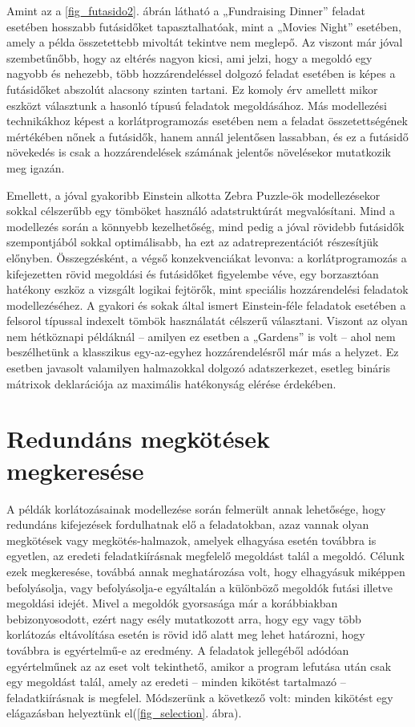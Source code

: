\documentclass[12pt,a4paper,twoside, openright]{report}
\begin{document}

    Amint az a \ref{fig_futasido2}. ábrán látható a „Fundraising Dinner” feladat esetében hosszabb futásidőket tapasztalhatóak, mint a „Movies Night” esetében, amely a példa összetettebb mivoltát tekintve nem meglepő.
    Az viszont már jóval szembetűnőbb, hogy az eltérés nagyon kicsi, ami jelzi, hogy a megoldó egy nagyobb és nehezebb, több hozzárendeléssel dolgozó feladat esetében is képes a futásidőket abszolút alacsony szinten tartani.
    Ez komoly érv amellett mikor eszközt választunk a hasonló típusú feladatok megoldásához.
    Más modellezési technikákhoz képest a korlátprogramozás esetében nem a feladat összetettségének mértékében nőnek a futásidők, hanem annál jelentősen lassabban, és ez a futásidő növekedés is csak a hozzárendelések számának jelentős növelésekor mutatkozik meg igazán.

    Emellett, a jóval gyakoribb Einstein alkotta Zebra Puzzle-ök modellezésekor sokkal célszerűbb egy tömböket használó adatstruktúrát megvalósítani.
    Mind a modellezés során a könnyebb kezelhetőség, mind pedig a jóval rövidebb futásidők szempontjából sokkal optimálisabb, ha ezt az adatreprezentációt részesítjük előnyben.
    Összegzésként, a végső konzekvenciákat levonva: a korlátprogramozás a kifejezetten rövid megoldási és futásidőket figyelembe véve, egy borzasztóan hatékony eszköz a vizsgált logikai fejtörők, mint speciális hozzárendelési feladatok modellezéséhez.
    A gyakori és sokak által ismert Einstein-féle feladatok esetében a felsorol típussal indexelt tömbök használatát célszerű választani.
    Viszont az olyan nem hétköznapi példáknál – amilyen ez esetben a „Gardens” is volt – ahol nem beszélhetünk a klasszikus egy-az-egyhez hozzárendelésről már más a helyzet.
    Ez esetben javasolt valamilyen halmazokkal dolgozó adatszerkezet, esetleg bináris mátrixok deklarációja az maximális hatékonyság elérése érdekében.

\chapter{Redundáns megkötések megkeresése}

    A példák korlátozásainak modellezése során felmerült annak lehetősége, hogy redundáns kifejezések fordulhatnak elő a feladatokban, azaz vannak olyan megkötések vagy megkötés-halmazok, amelyek elhagyása esetén továbbra is egyetlen, az eredeti feladatkiírásnak megfelelő megoldást talál a megoldó.
    Célunk ezek megkeresése, továbbá annak meghatározása volt, hogy elhagyásuk miképpen befolyásolja, vagy befolyásolja-e egyáltalán a különböző megoldók futási illetve megoldási idejét.
    Mivel a megoldók gyorsasága már a korábbiakban bebizonyosodott, ezért nagy esély mutatkozott arra, hogy  egy vagy több korlátozás eltávolítása esetén is rövid idő alatt meg lehet határozni, hogy továbbra is egyértelmű-e az eredmény.
    A feladatok jellegéből adódóan egyértelműnek az az eset volt tekinthető, amikor a program lefutása után csak egy megoldást talál, amely az eredeti – minden kikötést tartalmazó – feladatkiírásnak is megfelel.
    Módszerünk a következő volt: minden kikötést egy elágazásban helyeztünk el(\ref{fig_selection}. ábra).
\end{document}
